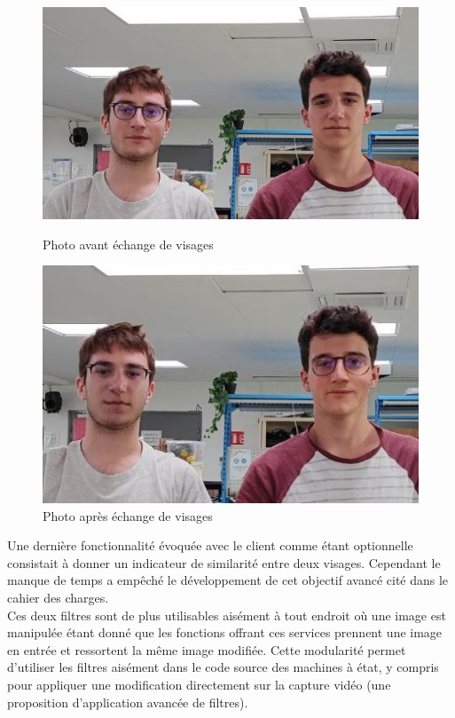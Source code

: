 \documentclass[a4paper,french]{article}
\begin{document}
\begin{figure}[h!]
	\begin{minipage}[b]{0.40\linewidth}
		\centering \includegraphics[scale=0.5]{figures/avant.jpg}
    \caption{Photo avant échange de visages}
    \label{fig:Avant}
	\end{minipage}\hfill
	\begin{minipage}[b]{0.48\linewidth}	
		\centering \includegraphics[scale=0.7]{figures/apres.jpg}
    \caption{Photo après échange de visages}
    \label{fig:Apres}
	\end{minipage}
\end{figure}

Une dernière fonctionnalité évoquée avec le client comme étant optionnelle consistait à donner un indicateur de similarité entre deux visages. Cependant le manque de temps a empêché le développement de cet objectif avancé cité dans le cahier des charges.\\

Ces deux filtres sont de plus utilisables aisément à tout endroit où une image est manipulée étant donné que les fonctions offrant ces services prennent une image en entrée et ressortent la même image modifiée. Cette modularité permet d'utiliser les filtres aisément dans le code source des machines à état, y compris pour appliquer une modification directement sur la capture vidéo (une proposition d'application avancée de filtres).
\end{document}
